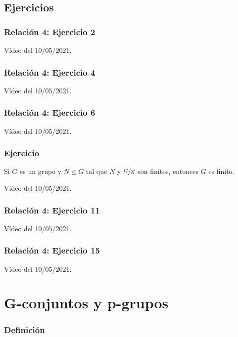 \documentclass[11pt,a4paper]{article}
\begin{document}

\subsection{Ejercicios}

\subsubsection*{Relación 4: Ejercicio 2}

Vídeo del 10/05/2021.

\subsubsection*{Relación 4: Ejercicio 4}

Vídeo del 10/05/2021.

\subsubsection*{Relación 4: Ejercicio 6}

Vídeo del 10/05/2021.

\subsubsection*{Ejercicio}

Si $G$ es un grupo y $N \unlhd G$ tal que $N$ y $\sfrac{G}{N}$ son finitos, entonces $G$ es finito.

Vídeo del 10/05/2021.

\subsubsection*{Relación 4: Ejercicio 11}

Vídeo del 10/05/2021.

\subsubsection*{Relación 4: Ejercicio 15}

Vídeo del 10/05/2021.

\newpage


\section{G-conjuntos y p-grupos}

\subsubsection*{Definición}
\end{document}
